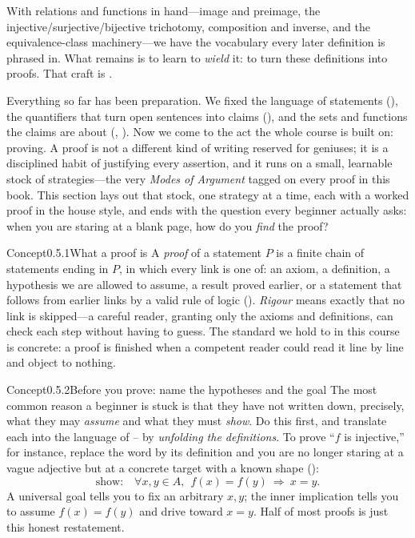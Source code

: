 \documentclass[main.tex]{subfiles}
\begin{document}
\noindent With relations and functions in hand---image and preimage, the injective/surjective/bijective
trichotomy, composition and inverse, and the equivalence-class machinery---we have the vocabulary every
later definition is phrased in. What remains is to learn to \emph{wield} it: to turn these definitions
into proofs. That craft is .
\clearpage

\noindent Everything so far has been preparation. We fixed the language of statements
(), the quantifiers that turn open sentences into claims (), and the sets and
functions the claims are about (, ). Now we come to the act the whole course is
built on: proving. A proof is not a different kind of writing reserved for geniuses; it is a
disciplined habit of justifying every assertion, and it runs on a small, learnable stock of
strategies---the very \emph{Modes of Argument} tagged on every proof in this book. This section
lays out that stock, one strategy at a time, each with a worked proof in the house style, and ends
with the question every beginner actually asks: when you are staring at a blank page, how do you
\emph{find} the proof?

\begin{ObjL}{Concept}{0.5.1}{What a proof is}
A \emph{proof} of a statement $P$ is a finite chain of statements ending in $P$, in which every link
is one of: an axiom, a definition, a hypothesis we are allowed to assume, a result proved earlier, or
a statement that follows from earlier links by a valid rule of logic (). \emph{Rigour}
means exactly that no link is skipped---a careful reader, granting only the axioms and definitions,
can check each step without having to guess. The standard we hold to in this course is concrete: a
proof is finished when a competent reader could read it line by line and object to nothing.
\end{ObjL}

\begin{ObjL}{Concept}{0.5.2}{Before you prove: name the hypotheses and the goal}
The most common reason a beginner is stuck is that they have not written down, precisely, what they
may \emph{assume} and what they must \emph{show}. Do this first, and translate each into the language
of -- by \emph{unfolding the definitions}. To prove ``$f$ is injective,'' for
instance, replace the word by its definition and you are no longer staring at a vague adjective but at
a concrete target with a known shape ():
\[
\text{show:}\quad \forall x,y\in A,\ \ f(x)=f(y)\ \Rightarrow\ x=y.
\]
A universal goal tells you to fix an arbitrary $x,y$; the inner implication tells you to assume
$f(x)=f(y)$ and drive toward $x=y$. Half of most proofs is just this honest restatement.
\end{ObjL}
\end{document}
